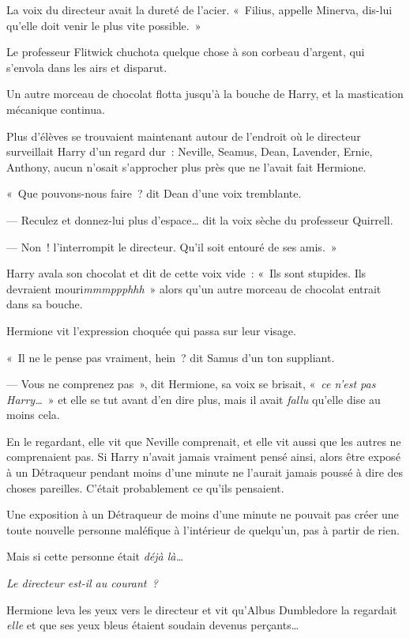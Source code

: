 La voix du directeur avait la dureté de l'acier.
«~Filius, appelle Minerva, dis-lui qu'elle doit venir le plus vite possible.~»

Le professeur Flitwick chuchota quelque chose à son corbeau d'argent, qui s'envola dans les airs et disparut.

Un autre morceau de chocolat flotta jusqu'à la bouche de Harry, et la mastication mécanique continua.

Plus d'élèves se trouvaient maintenant autour de l'endroit où le directeur surveillait Harry d'un regard dur~: Neville, Seamus, Dean, Lavender, Ernie, Anthony, aucun n'osait s'approcher plus près que ne l'avait fait Hermione.

«~Que pouvons-nous faire~? dit Dean d'une voix tremblante.

--- Reculez et donnez-lui plus d'espace… dit la voix sèche du professeur Quirrell.

--- Non~! l'interrompit le directeur.
Qu'il soit entouré de ses amis.~»

Harry avala son chocolat et dit de cette voix vide~: «~Ils sont stupides.
Ils devraient mouri\emph{mmmppphhh}~» alors qu'un autre morceau de chocolat entrait dans sa bouche.

Hermione vit l'expression choquée qui passa sur leur visage.

«~Il ne le pense pas vraiment, hein~? dit Samus d'un ton suppliant.

--- Vous ne comprenez pas~», dit Hermione, sa voix se brisait, «~\emph{ce n'est pas Harry…}~» et elle se tut avant d'en dire plus, mais il avait \emph{fallu} qu'elle dise au moins cela.

En le regardant, elle vit que Neville comprenait, et elle vit aussi que les autres ne comprenaient pas.
Si Harry n'avait jamais vraiment pensé ainsi, alors être exposé à un Détraqueur pendant moins d'une minute ne l'aurait jamais poussé à dire des choses pareilles.
C'était probablement ce qu'ils pensaient.

Une exposition à un Détraqueur de moins d'une minute ne pouvait pas créer une toute nouvelle personne maléfique à l'intérieur de quelqu'un, pas à partir de rien.

Mais si cette personne était \emph{déjà là…}

\emph{Le directeur est-il au courant~?}

Hermione leva les yeux vers le directeur et vit qu'Albus Dumbledore la regardait \emph{elle} et que ses yeux bleus étaient soudain devenus perçants…

